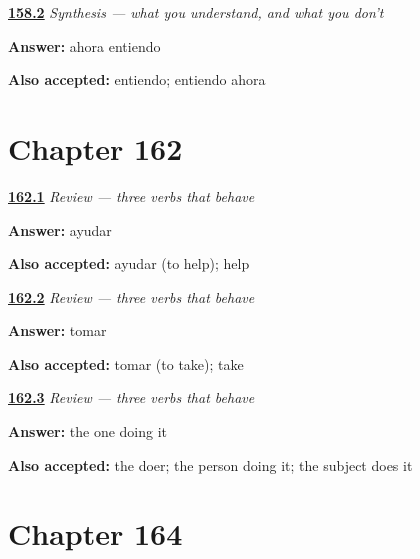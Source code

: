 \noindent\begin{minipage}[t]{\linewidth}
\raggedright
\hyperlink{review-ES-C34-sintesis-mente-now}{\textbf{158.2}} \emph{Synthesis — what you understand, and what you don't}\par
\small \textbf{Answer:} ahora entiendo\par
\footnotesize \textbf{Also accepted:} entiendo; entiendo ahora
\end{minipage}\par\medskip

\section*{Chapter 162}

\noindent\begin{minipage}[t]{\linewidth}
\raggedright
\hyperlink{review-ES-C35-repaso-tres-aid}{\textbf{162.1}} \emph{Review — three verbs that behave}\par
\small \textbf{Answer:} ayudar\par
\footnotesize \textbf{Also accepted:} ayudar (to help); help
\end{minipage}\par\medskip

\noindent\begin{minipage}[t]{\linewidth}
\raggedright
\hyperlink{review-ES-C35-repaso-tres-nostory}{\textbf{162.2}} \emph{Review — three verbs that behave}\par
\small \textbf{Answer:} tomar\par
\footnotesize \textbf{Also accepted:} tomar (to take); take
\end{minipage}\par\medskip

\noindent\begin{minipage}[t]{\linewidth}
\raggedright
\hyperlink{review-ES-C35-repaso-tres-who}{\textbf{162.3}} \emph{Review — three verbs that behave}\par
\small \textbf{Answer:} the one doing it\par
\footnotesize \textbf{Also accepted:} the doer; the person doing it; the subject does it
\end{minipage}\par\medskip

\section*{Chapter 164}

